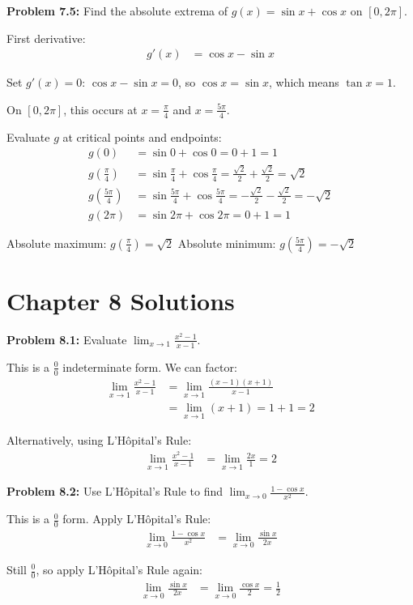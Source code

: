 \documentclass[12pt,a4paper]{book}
\theoremstyle{definition}
\begin{document}
\begin{solution}
\textbf{Problem 7.5:} Find the absolute extrema of $g(x) = \sin x + \cos x$ on $[0, 2\pi]$.

First derivative:
\begin{align}
g'(x) &= \cos x - \sin x
\end{align}

Set $g'(x) = 0$: $\cos x - \sin x = 0$, so $\cos x = \sin x$, which means $\tan x = 1$.

On $[0, 2\pi]$, this occurs at $x = \frac{\pi}{4}$ and $x = \frac{5\pi}{4}$.

Evaluate $g$ at critical points and endpoints:
\begin{align}
g(0) &= \sin 0 + \cos 0 = 0 + 1 = 1\\
g\left(\frac{\pi}{4}\right) &= \sin\frac{\pi}{4} + \cos\frac{\pi}{4} = \frac{\sqrt{2}}{2} + \frac{\sqrt{2}}{2} = \sqrt{2}\\
g\left(\frac{5\pi}{4}\right) &= \sin\frac{5\pi}{4} + \cos\frac{5\pi}{4} = -\frac{\sqrt{2}}{2} - \frac{\sqrt{2}}{2} = -\sqrt{2}\\
g(2\pi) &= \sin 2\pi + \cos 2\pi = 0 + 1 = 1
\end{align}

Absolute maximum: $g\left(\frac{\pi}{4}\right) = \sqrt{2}$
Absolute minimum: $g\left(\frac{5\pi}{4}\right) = -\sqrt{2}$
\end{solution}

\section*{Chapter 8 Solutions}

\begin{solution}
\textbf{Problem 8.1:} Evaluate $\lim_{x \to 1} \frac{x^2 - 1}{x - 1}$.

This is a $\frac{0}{0}$ indeterminate form. We can factor:
\begin{align}
\lim_{x \to 1} \frac{x^2 - 1}{x - 1} &= \lim_{x \to 1} \frac{(x - 1)(x + 1)}{x - 1}\\
&= \lim_{x \to 1} (x + 1) = 1 + 1 = 2
\end{align}

Alternatively, using L'Hôpital's Rule:
\begin{align}
\lim_{x \to 1} \frac{x^2 - 1}{x - 1} &= \lim_{x \to 1} \frac{2x}{1} = 2
\end{align}
\end{solution}

\begin{solution}
\textbf{Problem 8.2:} Use L'Hôpital's Rule to find $\lim_{x \to 0} \frac{1 - \cos x}{x^2}$.

This is a $\frac{0}{0}$ form. Apply L'Hôpital's Rule:
\begin{align}
\lim_{x \to 0} \frac{1 - \cos x}{x^2} &= \lim_{x \to 0} \frac{\sin x}{2x}
\end{align}

Still $\frac{0}{0}$, so apply L'Hôpital's Rule again:
\begin{align}
\lim_{x \to 0} \frac{\sin x}{2x} &= \lim_{x \to 0} \frac{\cos x}{2} = \frac{1}{2}
\end{align}
\end{solution}
\end{document}
